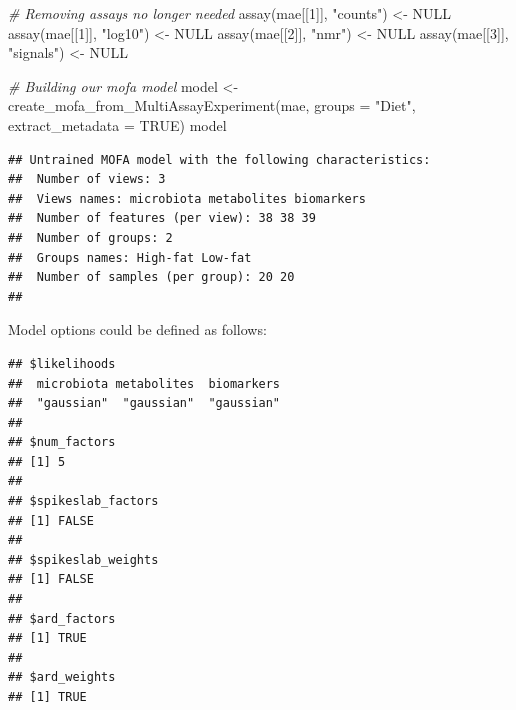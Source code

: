 \documentclass[
]{book}
\newenvironment{Shaded}{\begin{snugshade}}{\end{snugshade}}
\newcommand{\AttributeTok}[1]{\textcolor[rgb]{0.77,0.63,0.00}{#1}}
\newcommand{\CommentTok}[1]{\textcolor[rgb]{0.56,0.35,0.01}{\textit{#1}}}
\newcommand{\ConstantTok}[1]{\textcolor[rgb]{0.00,0.00,0.00}{#1}}
\newcommand{\DecValTok}[1]{\textcolor[rgb]{0.00,0.00,0.81}{#1}}
\newcommand{\FunctionTok}[1]{\textcolor[rgb]{0.00,0.00,0.00}{#1}}
\newcommand{\NormalTok}[1]{#1}
\newcommand{\OtherTok}[1]{\textcolor[rgb]{0.56,0.35,0.01}{#1}}
\newcommand{\SpecialCharTok}[1]{\textcolor[rgb]{0.00,0.00,0.00}{#1}}
\newcommand{\StringTok}[1]{\textcolor[rgb]{0.31,0.60,0.02}{#1}}
\begin{document}
\begin{Shaded}
\begin{Highlighting}[]
\CommentTok{\# Removing assays no longer needed}
\FunctionTok{assay}\NormalTok{(mae[[}\DecValTok{1}\NormalTok{]], }\StringTok{"counts"}\NormalTok{) }\OtherTok{\textless{}{-}} \ConstantTok{NULL}
\FunctionTok{assay}\NormalTok{(mae[[}\DecValTok{1}\NormalTok{]], }\StringTok{"log10"}\NormalTok{) }\OtherTok{\textless{}{-}} \ConstantTok{NULL}
\FunctionTok{assay}\NormalTok{(mae[[}\DecValTok{2}\NormalTok{]], }\StringTok{"nmr"}\NormalTok{) }\OtherTok{\textless{}{-}} \ConstantTok{NULL}
\FunctionTok{assay}\NormalTok{(mae[[}\DecValTok{3}\NormalTok{]], }\StringTok{"signals"}\NormalTok{) }\OtherTok{\textless{}{-}} \ConstantTok{NULL}

\CommentTok{\# Building our mofa model}
\NormalTok{model }\OtherTok{\textless{}{-}} \FunctionTok{create\_mofa\_from\_MultiAssayExperiment}\NormalTok{(mae,}
                                               \AttributeTok{groups =} \StringTok{"Diet"}\NormalTok{, }
                                               \AttributeTok{extract\_metadata =} \ConstantTok{TRUE}\NormalTok{)}
\NormalTok{model}
\end{Highlighting}
\end{Shaded}

\begin{verbatim}
## Untrained MOFA model with the following characteristics: 
##  Number of views: 3 
##  Views names: microbiota metabolites biomarkers 
##  Number of features (per view): 38 38 39 
##  Number of groups: 2 
##  Groups names: High-fat Low-fat 
##  Number of samples (per group): 20 20 
## 
\end{verbatim}

Model options could be defined as follows:

\begin{Shaded}
\end{Shaded}

\begin{verbatim}
## $likelihoods
##  microbiota metabolites  biomarkers 
##  "gaussian"  "gaussian"  "gaussian" 
## 
## $num_factors
## [1] 5
## 
## $spikeslab_factors
## [1] FALSE
## 
## $spikeslab_weights
## [1] FALSE
## 
## $ard_factors
## [1] TRUE
## 
## $ard_weights
## [1] TRUE
\end{verbatim}
\end{document}

